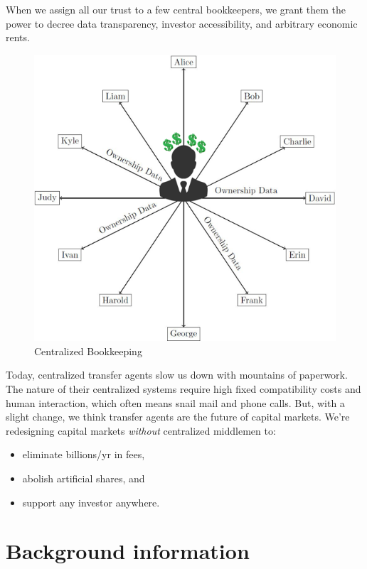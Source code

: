 \documentclass[11pt, english]{article}
\begin{document}
\begin{multicols}{2}

When we assign all our trust to a few central bookkeepers, we grant them the power to decree data transparency, investor accessibility, and arbitrary economic rents.

\begin{figure}[H]
    \raggedleft 
    \includegraphics[width=\linewidth]{imgs/centralized.png}
    \caption{Centralized Bookkeeping}
    \label{fig:centralized}
\end{figure}

Today, centralized transfer agents slow us down with mountains of paperwork. The nature of their centralized systems require high fixed compatibility costs and human interaction, which often means snail mail and phone calls. But, with a slight change, we think transfer agents are the future of capital markets. We're redesigning capital markets \hbox{\textit{without}} centralized middlemen to:
\begin{itemize}
    \item eliminate billions/yr in fees,
    \item abolish artificial shares, and
    \item support any investor anywhere.
\end{itemize}

\section{Background information}


\end{multicols}
\end{document}
